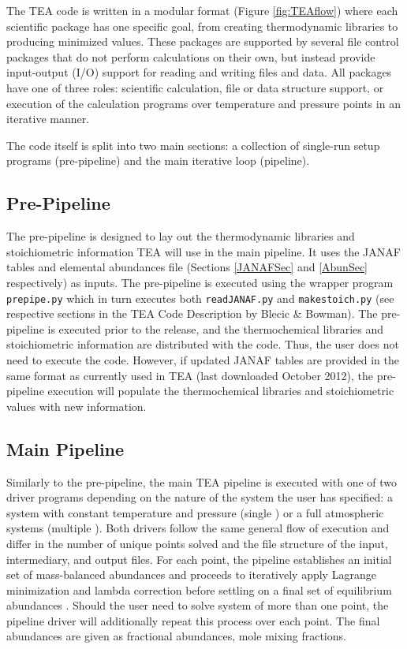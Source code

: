   The TEA code is written in a modular format
  (Figure \ref{fig:TEAflow}) where each scientific package has one
  specific goal, from creating thermodynamic libraries to producing
  minimized values.  These packages are supported by several file
  control packages that do not perform calculations on their own, but
  instead provide input-output (I/O) support for reading and writing
  files and data.  All packages have one of three roles: scientific
  calculation, file or data structure support, or execution of the
  calculation programs over temperature and pressure points in an
  iterative manner.

  The code itself is split into two main sections: a collection of
  single-run setup programs (pre-pipeline) and the main iterative loop
  (pipeline).

\subsection{Pre-Pipeline}
\label{pre-pipe}
  The pre-pipeline is designed to lay out the thermodynamic libraries
  and stoichiometric information TEA will use in the main pipeline. It
  uses the JANAF tables and elemental abundances file
  (Sections \ref{JANAFSec} and \ref{AbunSec} respectively) as inputs.
  The pre-pipeline is executed using the wrapper
  program \texttt{prepipe.py} which in turn executes
  both \texttt{readJANAF.py} and \texttt{makestoich.py} (see
  respective sections in the TEA Code Description by Blecic \&
  Bowman).  The pre-pipeline is executed prior to the release, and the
  thermochemical libraries and stoichiometric information are
  distributed with the code. Thus, the user does not need to execute
  the code. However, if updated JANAF tables are provided in the same
  format as currently used in TEA (last downloaded October 2012), the
  pre-pipeline execution will populate the thermochemical libraries
  and stoichiometric values with new information.

\subsection{Main Pipeline}
\label{pipel}
  Similarly to the pre-pipeline, the main TEA pipeline is executed
  with one of two driver programs depending on the nature of the
  system the user has specified: a system with constant temperature
  and pressure (single ) or a full atmospheric systems
  (multiple ). Both drivers follow the same general flow of
  execution and differ in the number of unique  points
  solved and the file structure of the input, intermediary, and output
  files.  For each  point, the pipeline establishes an
  initial set of mass-balanced abundances and proceeds to iteratively
  apply Lagrange minimization and lambda correction before settling on
  a final set of equilibrium
  abundances \citep{BlecicEtal2016-TEAtheory}. Should the user need to
  solve system of more than one  point, the pipeline driver
  will additionally repeat this process over each 
  point. The final abundances are given as fractional abundances, mole
  mixing fractions.


